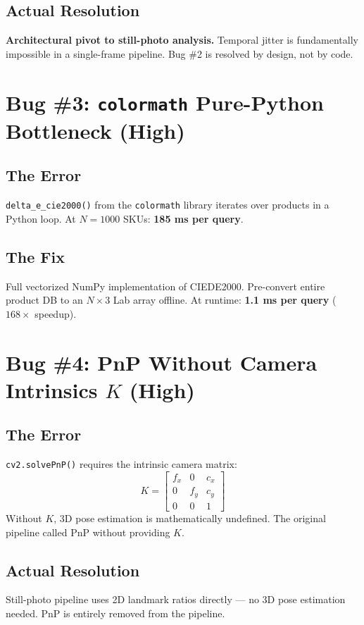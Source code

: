 \documentclass[12pt,a4paper]{article}
\begin{document}
\subsection{Actual Resolution}
\textbf{Architectural pivot to still-photo analysis.} Temporal jitter is fundamentally impossible in a single-frame pipeline. Bug \#2 is resolved by design, not by code.


\section{Bug \#3: \texttt{colormath} Pure-Python Bottleneck (High)}

\subsection{The Error}
\texttt{delta\_e\_cie2000()} from the \texttt{colormath} library iterates over products in a Python loop. At $N{=}1000$ SKUs: \textbf{185 ms per query}.

\subsection{The Fix}
Full vectorized NumPy implementation of CIEDE2000. Pre-convert entire product DB to an $N \times 3$ Lab array offline. At runtime: \textbf{1.1 ms per query} ($168\times$ speedup).


\section{Bug \#4: PnP Without Camera Intrinsics $K$ (High)}

\subsection{The Error}
\texttt{cv2.solvePnP()} requires the intrinsic camera matrix:
\begin{equation}
K = \begin{bmatrix} f_x & 0 & c_x \\ 0 & f_y & c_y \\ 0 & 0 & 1 \end{bmatrix}
\end{equation}
Without $K$, 3D pose estimation is mathematically undefined. The original pipeline called PnP without providing $K$.

\subsection{Actual Resolution}
Still-photo pipeline uses 2D landmark ratios directly --- no 3D pose estimation needed. PnP is entirely removed from the pipeline.
\end{document}
